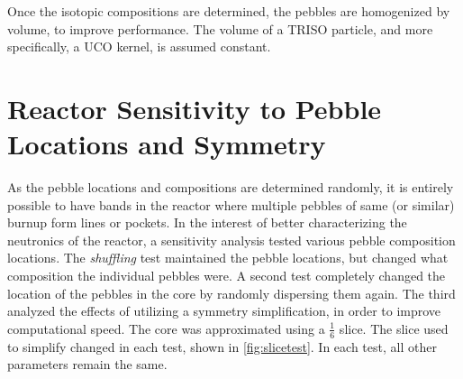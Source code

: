 

Once the isotopic compositions are determined, the pebbles are homogenized by volume, to improve performance.  The volume of a TRISO particle, and more specifically, a UCO kernel, is assumed constant.

\section{Reactor Sensitivity to Pebble Locations and Symmetry}

As the pebble locations and compositions are determined randomly, it is entirely possible to have bands in the reactor where multiple pebbles of same (or similar) burnup form lines or pockets.  In the interest of better characterizing the neutronics of the reactor, a sensitivity analysis tested various pebble composition locations.  The \emph{shuffling} test maintained the pebble locations, but changed what composition the individual pebbles were.  A second test completely changed the location of the pebbles in the core by randomly dispersing them again.  The third analyzed the effects of utilizing a symmetry simplification, in order to improve computational speed.  The core was approximated using a $\frac{1}{6}$ slice.  The slice used to simplify changed in each test, shown in \ref{fig:slicetest}.  In each test, all other parameters remain the same.

